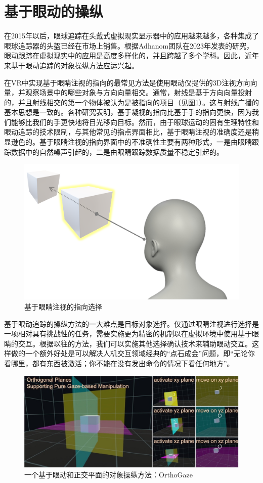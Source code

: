 \section{基于眼动的操纵}

在2015年以后，眼球追踪在头戴式虚拟现实显示器中的应用越来越多，各种集成了眼球追踪器的头盔已经在市场上销售。根据Adhanom团队在2023年发表的研究，眼动跟踪在虚拟现实中的应用是高度多样化的，并且跨越了多个学科。因此，近年来基于眼动追踪的对象操纵方法应运兴起。

在VR中实现基于眼睛注视的指向的最常见方法是使用眼动仪提供的3D注视方向向量，并观察场景中的哪些对象与方向向量相交。通常，射线是基于方向向量投射的，并且射线相交的第一个物体被认为是被指向的项目（见图\ref{fig-6}）。这与射线广播的基本思想是一致的。各种研究表明，基于凝视的指向比基于手的指向更快，因为我们能够比我们的手更快地将目光移向目标。然而，由于眼球运动的固有生理特性和眼动追踪的技术限制，与其他常见的指点界面相比，基于眼睛注视的准确度还是稍显逊色的。基于眼睛注视的指向界面中的不准确性主要有两种形式，一是由眼睛跟踪数据中的自然噪声引起的，二是由眼睛跟踪数据质量不稳定引起的。

\begin{figure}[b!]
    \centering
    \includegraphics[width=.45\textwidth]{figure/gazing_raycasting.png}
    \caption{基于眼睛注视的指向选择}
    \label{fig-6}
\end{figure}

基于眼动追踪的操纵方法的一大难点是目标对象选择。仅通过眼睛注视进行选择是一项相对具有挑战性的任务，需要实施更为精密的机制以在虚拟环境中使用基于眼睛的交互。根据以往的方法，我们可以实施其他选择确认技术来辅助眼动交互。这样做的一个额外好处是可以解决人机交互领域经典的“点石成金”问题，即“无论你看哪里，都有东西被激活；你不能在没有发出命令的情况下看任何地方”。

\begin{figure}[t!]
    \centering
    \includegraphics[width=.7\textwidth]{figure/orthogaze.jpg}
    \caption{一个基于眼动和正交平面的对象操纵方法：OrthoGaze}
    \label{fig-7}
\end{figure}

